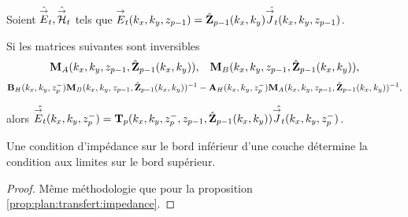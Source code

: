     \begin{prop}%
      \label{prop:plan:relevement:impedance}

      Soient \(\hat{{\overset{\rightarrow}{E}}}_t,\hat{{\overset{\rightarrow}{\mathcal{H}}}}_t\) tels que \({\overset{\rightarrow}{E}}_t(k_x,k_y,z_{p-1}) = \hat{\mathbf{Z}}_{p-1}(k_x,k_y)\hat{{\overset{\rightarrow}{J}}_t}(k_x,k_y,z_{p-1})\).

      Si les matrices suivantes sont inversibles
      \begin{align*}
        \mathbf{M}_{A}(k_x,k_y,z_{p-1},\hat{\mathbf{Z}}_{p-1}(k_x,k_y)), && \mathbf{M}_{B}(k_x,k_y,z_{p-1},\hat{\mathbf{Z}}_{p-1}(k_x,k_y)),
      \end{align*}
      \begin{align*}
        \mathbf{B}_{H}(k_x,k_y,z_p^-)\mathbf{M}_{B}(k_x,k_y,z_{p-1},\hat{\mathbf{Z}}_{p-1}(k_x,k_y))^{-1} - \mathbf{A}_{H}(k_x,k_y,z_p^-)\mathbf{M}_{A}(k_x,k_y,z_{p-1},\hat{\mathbf{Z}}_{p-1}(k_x,k_y))^{-1},
      \end{align*}

      alors \(\hat{{\overset{\rightarrow}{E}}_t}(k_x,k_y,z_p^-) = \mathbf{T}_p(k_x,k_y,z_p^-,z_{p-1},\hat{\mathbf{Z}}_{p-1}(k_x,k_y))\hat{{\overset{\rightarrow}{J}}_t}(k_x,k_y,z_p^-)\).

      Une condition d'impédance sur le bord inférieur d'une couche détermine la condition aux limites sur le bord supérieur.
    \end{prop}

      



    \begin{proof}
      Même méthodologie que pour la proposition \ref{prop:plan:transfert:impedance}.
    \end{proof}


